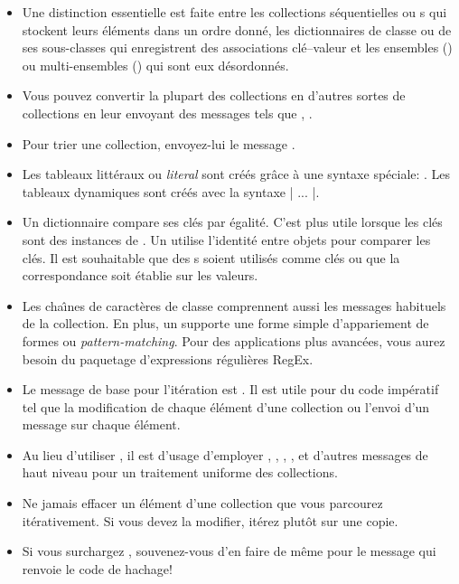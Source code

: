 \documentclass[a4paper,10pt,twoside]{book}
\begin{document}
\begin{itemize}
  \item Une distinction essentielle est faite entre les collections s\'equentielles ou 
s qui stockent leurs \'el\'ements dans un ordre
donn\'e, les dictionnaires de classe  ou de ses sous-classes qui
enregistrent des associations cl\'e--valeur et les ensembles 
() ou multi-ensembles () qui sont eux d\'esordonn\'es.
  \item Vous pouvez convertir la plupart des collections en d'autres sortes de 
collections en leur envoyant des messages tels que ,  \etc.
  \item Pour trier une collection, envoyez-lui le message .
  \item Les tableaux litt\'eraux ou \emph{literal}  sont cr\'e\'es 
gr\^ace \`a une syntaxe sp\'eciale: .  Les tableaux dynamiques
sont cr\'e\'es avec la syntaxe \ct|{ ... }|.
  \item Un dictionnaire  compare ses cl\'es par \'egalit\'e.
C'est plus utile lorsque les cl\'es sont des instances de . 
Un  utilise l'identit\'e entre objets pour comparer les cl\'es. Il est souhaitable que des s soient utilis\'es comme cl\'es ou que la correspondance soit \'etablie sur les valeurs.
  \item Les cha\^{\i}nes de caract\`eres de classe  comprennent
aussi les messages habituels de la collection. En plus, un  
supporte une forme simple d'appariement de formes ou \emph{pattern-matching}. 
Pour des applications plus avanc\'ees, vous aurez besoin du paquetage d'expressions r\'eguli\`eres RegEx.
  \item Le message de base pour l'it\'eration est . Il est 
utile pour du code imp\'eratif tel que la modification de chaque \'el\'ement d'une collection ou l'envoi d'un message sur chaque \'el\'ement.
  \item Au lieu d'utiliser , il est d'usage d'employer , , , ,  et d'autres messages de haut niveau pour un traitement uniforme des collections.
  \item Ne jamais effacer un \'el\'ement d'une collection que vous parcourez it\'erativement. Si vous devez la modifier, it\'erez plut\^ot sur une copie.
  \item Si vous surchargez \ct{=}, souvenez-vous d'en faire de m\^eme pour le message  
qui renvoie le code de hachage!
\end{itemize}

\ifx\wholebook\relax\else
   
   
\end{document}
